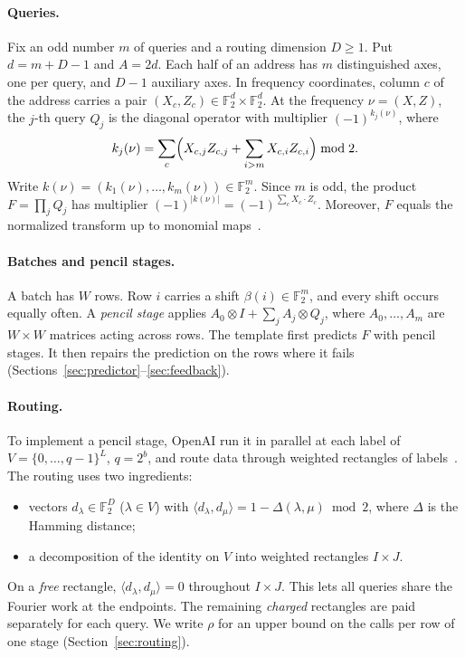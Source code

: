 \documentclass[acmsmall,nonacm,screen]{acmart}
\newcommand{\F}{\mathbb{F}}
\begin{document}
\paragraph{Queries.} Fix an odd number $m$ of queries and a routing dimension $D\ge1$. Put $d=m+D-1$ and $A=2d$. Each half of an address has $m$ distinguished axes, one per query, and $D-1$ auxiliary axes. In frequency coordinates, column $c$ of the address carries a pair $(X_c,Z_c)\in\F_2^d\times\F_2^d$. At the frequency $\nu=(X,Z)$, the $j$-th query $Q_j$ is the diagonal operator with multiplier $(-1)^{k_j(\nu)}$, where
\[
  k_j(\nu)=\sum_c\Bigl(X_{c,j}Z_{c,j}+\sum_{i>m}X_{c,i}Z_{c,i}\Bigr)\bmod 2 .
\]
Write $k(\nu)=(k_1(\nu),\dots,k_m(\nu))\in\F_2^m$. Since $m$ is odd, the product $F=\prod_jQ_j$ has multiplier $(-1)^{|k(\nu)|}=(-1)^{\sum_cX_c\cdot Z_c}$. Moreover, $F$ equals the normalized transform up to monomial maps~\cite[\S5.1]{oai2026}.

\paragraph{Batches and pencil stages.} A batch has $W$ rows. Row $i$ carries a shift $\beta(i)\in\F_2^m$, and every shift occurs equally often. A \emph{pencil stage} applies $A_0\otimes I+\sum_jA_j\otimes Q_j$, where $A_0,\dots,A_m$ are $W\times W$ matrices acting across rows. The template first predicts $F$ with pencil stages. It then repairs the prediction on the rows where it fails (Sections~\ref{sec:predictor}--\ref{sec:feedback}).

\paragraph{Routing.} To implement a pencil stage, OpenAI run it in parallel at each label of $V=\{0,\dots,q-1\}^L$, $q=2^b$, and route data through weighted rectangles of labels~\cite[\S5.2--5.3]{oai2026}. The routing uses two ingredients:
\begin{itemize}
\item vectors $d_\lambda\in\F_2^D$ ($\lambda\in V$) with $\langle d_\lambda,d_\mu\rangle=1-\Delta(\lambda,\mu)\bmod2$, where $\Delta$ is the Hamming distance;
\item a decomposition of the identity on $V$ into weighted rectangles $I\times J$.
\end{itemize}
On a \emph{free} rectangle, $\langle d_\lambda,d_\mu\rangle=0$ throughout $I\times J$. This lets all queries share the Fourier work at the endpoints. The remaining \emph{charged} rectangles are paid separately for each query. We write $\rho$ for an upper bound on the calls per row of one stage (Section~\ref{sec:routing}).
\end{document}
